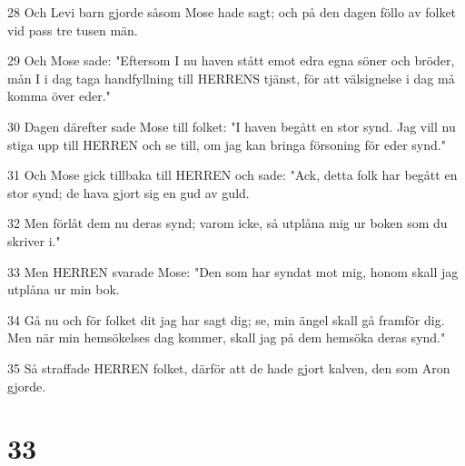 \par 28 Och Levi barn gjorde såsom Mose hade sagt; och på den dagen föllo av folket vid pass tre tusen män.
\par 29 Och Mose sade: "Eftersom I nu haven stått emot edra egna söner och bröder, mån I i dag taga handfyllning till HERRENS tjänst, för att välsignelse i dag må komma över eder."
\par 30 Dagen därefter sade Mose till folket: "I haven begått en stor synd. Jag vill nu stiga upp till HERREN och se till, om jag kan bringa försoning för eder synd."
\par 31 Och Mose gick tillbaka till HERREN och sade: "Ack, detta folk har begått en stor synd; de hava gjort sig en gud av guld.
\par 32 Men förlåt dem nu deras synd; varom icke, så utplåna mig ur boken som du skriver i."
\par 33 Men HERREN svarade Mose: "Den som har syndat mot mig, honom skall jag utplåna ur min bok.
\par 34 Gå nu och för folket dit jag har sagt dig; se, min ängel skall gå framför dig. Men när min hemsökelses dag kommer, skall jag på dem hemsöka deras synd."
\par 35 Så straffade HERREN folket, därför att de hade gjort kalven, den som Aron gjorde.

\chapter{33}

